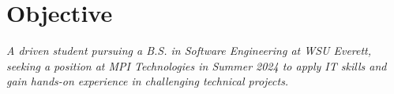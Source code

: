 \section{Objective}
\textit{A driven student pursuing a B.S. in Software Engineering at WSU Everett, seeking a position at MPI Technologies in Summer 2024 to apply IT skills and gain hands-on experience in challenging technical projects. \\}
